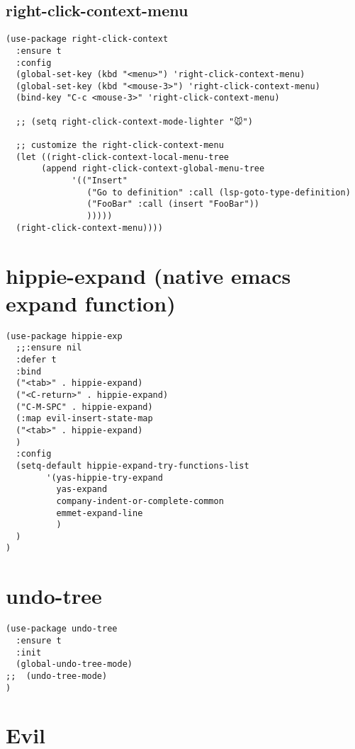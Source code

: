 \documentclass[11pt]{article}
\begin{document}
\subsection*{right-click-context-menu}
\label{sec:org58b4299}

\begin{verbatim}
(use-package right-click-context
  :ensure t
  :config
  (global-set-key (kbd "<menu>") 'right-click-context-menu)
  (global-set-key (kbd "<mouse-3>") 'right-click-context-menu)
  (bind-key "C-c <mouse-3>" 'right-click-context-menu)

  ;; (setq right-click-context-mode-lighter "🐭")

  ;; customize the right-click-context-menu
  (let ((right-click-context-local-menu-tree
       (append right-click-context-global-menu-tree
             '(("Insert"
                ("Go to definition" :call (lsp-goto-type-definition)
                ("FooBar" :call (insert "FooBar"))
                )))))
  (right-click-context-menu))))
\end{verbatim}

\section*{hippie-expand (native emacs expand function)}
\label{sec:org0b949c6}

\begin{verbatim}
(use-package hippie-exp
  ;;:ensure nil
  :defer t
  :bind
  ("<tab>" . hippie-expand)
  ("<C-return>" . hippie-expand)
  ("C-M-SPC" . hippie-expand)
  (:map evil-insert-state-map
  ("<tab>" . hippie-expand)
  )
  :config
  (setq-default hippie-expand-try-functions-list
        '(yas-hippie-try-expand
          yas-expand
          company-indent-or-complete-common
          emmet-expand-line
          )
  )
)
\end{verbatim}


\section*{undo-tree}
\label{sec:org768ffc8}
\begin{verbatim}
(use-package undo-tree
  :ensure t
  :init
  (global-undo-tree-mode)
;;  (undo-tree-mode)
)
\end{verbatim}

\section*{Evil}
\label{sec:org685cc8c}
\end{document}
